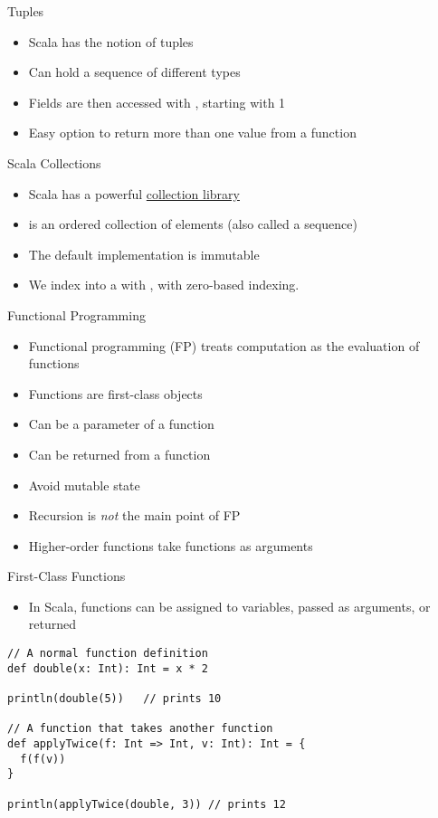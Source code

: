 \begin{frame}[fragile]{Tuples}
\begin{itemize}
\item Scala has the notion of tuples
\item Can hold a sequence of different types
\item Fields are then accessed with , starting with 1
\item Easy option to return more than one value from a function
\end{itemize}
\end{frame}

\begin{frame}[fragile]{Scala Collections}
\begin{itemize}
\item Scala has a powerful \href{https://docs.scala-lang.org/overviews/collections-2.13/overview.html}{collection library}
\item {} is an ordered collection of elements (also called a sequence)
\item The default implementation is immutable
\item We index into a  with \code{()}, with zero-based indexing.
\end{itemize}
\end{frame}

\begin{frame}[fragile]{Functional Programming}
\begin{itemize}
\item Functional programming (FP) treats computation as the evaluation of functions
\item Functions are first-class objects
\item Can be a parameter of a function
\item Can be returned from a function
\item Avoid mutable state
\item Recursion is \emph{not} the main point of FP
\item Higher-order functions take functions as arguments
\end{itemize}
\end{frame}


\begin{frame}[fragile]{First-Class Functions}
\begin{itemize}
    \item In Scala, functions can be assigned to variables, passed as arguments, or returned
\end{itemize}

\begin{verbatim}
// A normal function definition
def double(x: Int): Int = x * 2

println(double(5))   // prints 10

// A function that takes another function
def applyTwice(f: Int => Int, v: Int): Int = {
  f(f(v))
}

println(applyTwice(double, 3)) // prints 12
\end{verbatim}
\end{frame}

